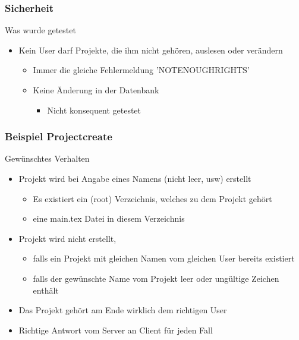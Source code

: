\documentclass{beamer}
\begin{document}
    \begin{frame}
    \frametitle{Sicherheit}
    \begin{block}{Was wurde getestet}
    \begin{itemize}
     \item Kein User darf Projekte, die ihm nicht gehören, auslesen oder verändern 
     \begin{itemize}
      \item Immer die gleiche Fehlermeldung 'NOTENOUGHRIGHTS'
      \item Keine Änderung in der Datenbank
      \begin{itemize}
       \item Nicht konsequent getestet
      \end{itemize}
     \end{itemize}
    \end{itemize}
    \end{block}
  \end{frame}
  
  
  \begin{frame}
   \frametitle{Beispiel Projectcreate}
   \begin{block}{Gewünschtes Verhalten}
    \begin{itemize}
     \item Projekt wird bei Angabe eines Namens (nicht leer, usw) erstellt
     \begin{itemize}
      \item Es existiert ein (root) Verzeichnis, welches zu dem Projekt gehört
      \item eine main.tex Datei in diesem Verzeichnis
     \end{itemize}
     \item Projekt wird nicht erstellt, 
     \begin{itemize}
     \item falls ein Projekt mit gleichen Namen vom gleichen User bereits existiert
     \item falls der gewünschte Name vom Projekt leer oder ungültige Zeichen enthält
     \end{itemize}
     \item Das Projekt gehört am Ende wirklich dem richtigen User
     \item Richtige Antwort vom Server an Client für jeden Fall
    \end{itemize}
   \end{block}
  \end{frame}


\end{document}
